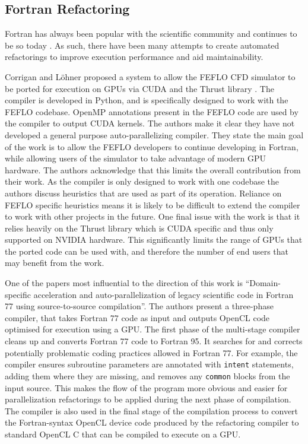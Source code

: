 \documentclass{mpaper}
\begin{document}
\subsection{Fortran Refactoring}

Fortran has always been popular with the scientific community and continues to be so today  \cite{VanderbauwhedeDavidson2018}.
As such, there have been many attempts \cite{Oancea2012, Corrigan2012, Orchard2013, Overbey2005} to create automated refactorings to improve execution performance and aid maintainability. 

Corrigan and L{\"{o}}hner proposed a system to allow the FEFLO CFD simulator \cite{Lbhner2001} to be ported for execution on GPUs via CUDA and the Thrust library \cite{Library}.
The compiler is developed in Python, and is specifically designed to work with the FEFLO codebase.
OpenMP \cite{OpenMP} annotations present in the FEFLO code are used by the compiler to output CUDA kernels.
The authors make it clear they have not developed a general purpose auto-parallelizing compiler.
They state the main goal of the work is to allow the FEFLO developers to continue developing in Fortran, while allowing users of the simulator to take advantage of modern GPU hardware.
The authors acknowledge that this limits the overall contribution from their work.
As the compiler is only designed to work with one codebase the authors discuss heuristics that are used as part of its operation.
Reliance on FEFLO specific heuristics means it is likely to be difficult to extend the compiler to work with other projects in the future.
One final issue with the work is that it relies heavily on the Thrust library which is CUDA specific and thus only supported on NVIDIA hardware.
This significantly limits the range of GPUs that the ported code can be used with, and therefore the number of end users that may benefit from the work.

One of the papers most influential to the direction of this work is ``Domain-specific acceleration and auto-parallelization of legacy scientific code in Fortran 77 using source-to-source compilation''\cite{VanderbauwhedeDavidson2018}. 
The authors present a three-phase compiler, that takes Fortran 77 code as input and outputs OpenCL code optimised for execution using a GPU.
The first phase of the multi-stage compiler cleans up and converts Fortran 77 code to Fortran 95.
It searches for and corrects potentially problematic coding practices allowed in Fortran 77.
For example, the compiler ensures subroutine parameters are annotated with \texttt{intent} statements, adding them where they are missing, and removes any \texttt{common} blocks from the input source.
This makes the flow of the program more obvious and easier for parallelization refactorings to be applied during the next phase of compilation.
The compiler is also used in the final stage of the compilation process to convert the Fortran-syntax OpenCL device code produced by the refactoring compiler to standard OpenCL C that can be compiled to execute on a GPU.
\end{document}
